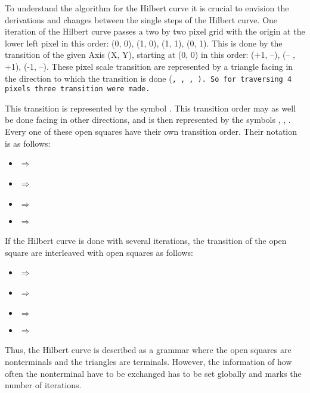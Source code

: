 To understand the algorithm for the Hilbert curve it is crucial to envision the derivations and changes between the single steps of the Hilbert curve. One iteration of the Hilbert curve passes a two by two pixel grid with the origin at the lower left pixel in this order: (0, 0), (1, 0), (1, 1), (0, 1). This is done by the transition of the given Axis (X, Y), starting at (0, 0) in this order: (+1, --), (-- , +1), (-1, --). These pixel scale transition are represented by a triangle facing in the direction to which the transition is done (\tt, \tl, \tb, \tr). So for traversing 4 pixels three transition were made.

This transition is represented by the symbol \sqr. This transition order may as well be done facing in other directions, and is then represented by the symbols \sqt, \sql, \sqb. Every one of these open squares have their own transition order. Their notation is as follows:

\begin{itemize}%
   \item \sqr $\Rightarrow$ \tr \tt \tl
   \item \sqt $\Rightarrow$ \tt \tr \tb
   \item \sql $\Rightarrow$ \tl \tb \tr
   \item \sqb $\Rightarrow$ \tb \tl \tt
\end{itemize}%

If the Hilbert curve is done with several iterations, the transition of the open square are interleaved with open squares as follows:

\begin{itemize}%
   \item \sqr $\Rightarrow$ \sqt \tr \sqr \tt \sqr \tl \sqb
   \item \sqt $\Rightarrow$ \sqr \tt \sqt \tr \sqt \tb \sql
   \item \sql $\Rightarrow$ \sqb \tl \sql \tb \sql \tr \sqt
   \item \sqb $\Rightarrow$ \sql \tb \sqb \tl \sqb \tt \sqr
\end{itemize}%

Thus, the Hilbert curve is described as a grammar where the open squares are nonterminals and the triangles are terminals. However, the information of how often the nonterminal have to be exchanged has to be set globally and marks the number of iterations.

